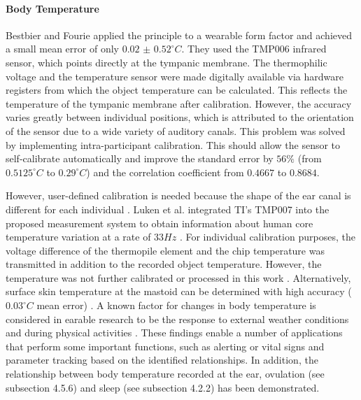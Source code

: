 \paragraph{Body Temperature}
\label{Background:SensingWithEarables:Physiological:BodyTemperature}
Bestbier and Fourie \cite{bestbierDevelopmentVitalSigns2018} applied the principle to a wearable form factor and achieved a small mean error of only $0.02$ $\pm$ $0.52 ^\circ C$. 
They used the TMP006 infrared sensor, which points directly at the tympanic membrane. 
The thermophilic voltage and the temperature sensor were made digitally available via hardware registers from which the object temperature can be calculated. 
This reflects the temperature of the tympanic membrane after calibration.
However, the accuracy varies greatly between individual positions, which is attributed to the orientation of the sensor due to a wide variety of auditory canals.
This problem was solved by implementing intra-participant calibration.
This should allow the sensor to self-calibrate automatically and improve the standard error by $56\%$ (from $0.5125 ^\circ C$ to $0.29 ^\circ C$) and the correlation coefficient from $0.4667$ to $0.8684$.

However, user-defined calibration is needed because the shape of the ear canal is different for each individual \cite{bestbierDevelopmentVitalSigns2018, luekenPhotoplethysmographybasedInearSensor2017, matsumotoEarbudtypeWearableHearable2019}.
Luken et al. integrated TI's TMP007 into the proposed measurement system to obtain information about human core temperature variation at a rate of $33 Hz$ \cite{luekenPhotoplethysmographybasedInearSensor2017}.
For individual calibration purposes, the voltage difference of the thermopile element and the chip temperature was transmitted in addition to the recorded object temperature.
However, the temperature was not further calibrated or processed in this work \cite{luekenPhotoplethysmographybasedInearSensor2017}.
Alternatively, surface skin temperature at the mastoid can be determined with high accuracy ($0.03 ^\circ C$ mean error) \cite{atallahErgonomicWearableCore2018}.
A known factor for changes in body temperature is considered in earable research to be the response to external weather conditions \cite{barralonAugmentedHearingAssistance2015, boanoNoninvasiveMeasurementCore2013, celikEvaluationBehindtheEarECG2016} and during physical activities \cite{boanoNoninvasiveMeasurementCore2013, chagllae.MeasurementCoreBody2018, celikEvaluationBehindtheEarECG2016, matsumotoEarbudtypeWearableHearable2019, sugimotoDevelopmentWirelessSensing2011}.
These findings enable a number of applications that perform some important functions, such as alerting or vital signs and parameter tracking based on the identified relationships.
In addition, the relationship between body temperature recorded at the ear, ovulation (see subsection 4.5.6) and sleep (see subsection 4.2.2) has been demonstrated.

